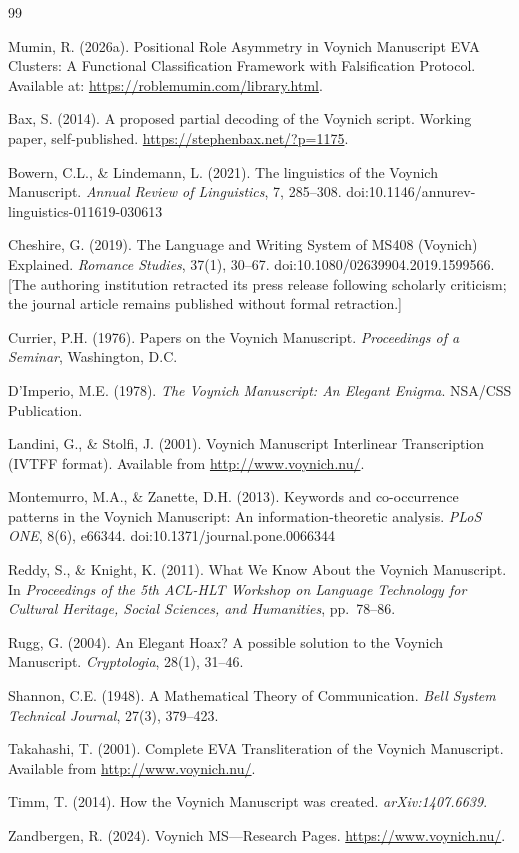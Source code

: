 \documentclass[11pt,a4paper,twocolumn]{article}
\begin{document}
\begin{thebibliography}{99}
\small

 Mumin, R. (2026a). Positional Role Asymmetry in Voynich Manuscript EVA Clusters: A Functional Classification Framework with Falsification Protocol. Available at: \url{https://roblemumin.com/library.html}.

 Bax, S. (2014). A proposed partial decoding of the Voynich script. Working paper, self-published. \url{https://stephenbax.net/?p=1175}.

 Bowern, C.L., \& Lindemann, L. (2021). The linguistics of the Voynich Manuscript. \textit{Annual Review of Linguistics}, 7, 285--308. doi:10.1146/annurev-linguistics-011619-030613

 Cheshire, G. (2019). The Language and Writing System of MS408 (Voynich) Explained. \textit{Romance Studies}, 37(1), 30--67. doi:10.1080/02639904.2019.1599566. [The authoring institution retracted its press release following scholarly criticism; the journal article remains published without formal retraction.]

 Currier, P.H. (1976). Papers on the Voynich Manuscript. \textit{Proceedings of a Seminar}, Washington, D.C.

 D'Imperio, M.E. (1978). \textit{The Voynich Manuscript: An Elegant Enigma}. NSA/CSS Publication.

 Landini, G., \& Stolfi, J. (2001). Voynich Manuscript Interlinear Transcription (IVTFF format). Available from \url{http://www.voynich.nu/}.

 Montemurro, M.A., \& Zanette, D.H. (2013). Keywords and co-occurrence patterns in the Voynich Manuscript: An information-theoretic analysis. \textit{PLoS ONE}, 8(6), e66344. doi:10.1371/journal.pone.0066344

 Reddy, S., \& Knight, K. (2011). What We Know About the Voynich Manuscript. In \textit{Proceedings of the 5th ACL-HLT Workshop on Language Technology for Cultural Heritage, Social Sciences, and Humanities}, pp.\ 78--86.

 Rugg, G. (2004). An Elegant Hoax? A possible solution to the Voynich Manuscript. \textit{Cryptologia}, 28(1), 31--46.

 Shannon, C.E. (1948). A Mathematical Theory of Communication. \textit{Bell System Technical Journal}, 27(3), 379--423.

 Takahashi, T. (2001). Complete EVA Transliteration of the Voynich Manuscript. Available from \url{http://www.voynich.nu/}.

 Timm, T. (2014). How the Voynich Manuscript was created. \textit{arXiv:1407.6639}.

 Zandbergen, R. (2024). Voynich MS---Research Pages. \url{https://www.voynich.nu/}.

\end{thebibliography}
\end{document}
